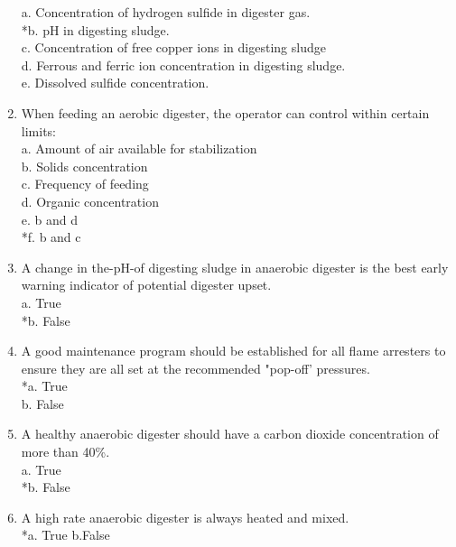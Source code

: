 \documentclass{article}
\begin{document}
\begin{enumerate}
a. Concentration of hydrogen sulfide in digester gas. \\
*b. pH in digesting sludge. \\
c. Concentration of free copper ions in digesting sludge \\
d. Ferrous and ferric ion concentration in digesting sludge. \\
e. Dissolved sulfide concentration. \\

\item  When feeding an aerobic digester, the operator can control within certain limits: \\

a. Amount of air available for stabilization \\
b. Solids concentration \\
c. Frequency of feeding \\
d. Organic concentration \\
e. b and d \\
*f. b and c \\

\item  A change in the-pH-of digesting sludge in anaerobic digester is the best early warning indicator of potential digester upset. \\

a. True \\
*b. False \\

\item  A good maintenance program should be established for all flame arresters to ensure they are all set at the recommended "pop-off' pressures. \\

*a. True \\
b. False \\

\item  A healthy anaerobic digester should have a carbon dioxide concentration of more than 40\%. \\

a. True \\
*b. False \\

\item  A high rate anaerobic digester is always heated and mixed. \\

*a. True
b.False \\


\end{enumerate}
\end{document}

